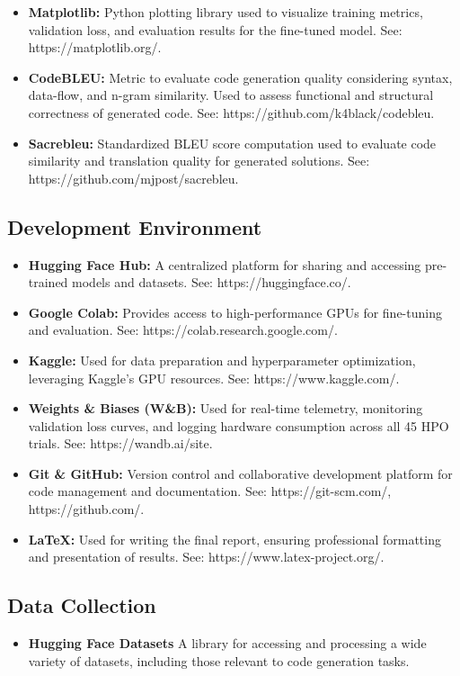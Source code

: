 \begin{itemize}
    \item \textbf{Matplotlib:} Python plotting library used to visualize training metrics, validation loss, and evaluation results for the fine-tuned model. See: https://matplotlib.org/.
    \item \textbf{CodeBLEU:} Metric to evaluate code generation quality considering syntax, data-flow, and n-gram similarity. Used to assess functional and structural correctness of generated code. See: https://github.com/k4black/codebleu.
    \item \textbf{Sacrebleu:} Standardized BLEU score computation used to evaluate code similarity and translation quality for generated solutions. See: https://github.com/mjpost/sacrebleu.
\end{itemize}

\subsection{Development Environment}
\begin{itemize}
    \item \textbf{Hugging Face Hub:}
    A centralized platform for sharing and accessing pre-trained models and datasets. See: https://huggingface.co/.
    \item \textbf{Google Colab:}
    Provides access to high-performance GPUs for fine-tuning and evaluation. See: https://colab.research.google.com/.
    \item \textbf{Kaggle:}
    Used for data preparation and hyperparameter optimization, leveraging Kaggle's GPU resources. See: https://www.kaggle.com/.
    \item \textbf{Weights \& Biases (W\&B):} 
    Used for real-time telemetry, monitoring validation loss curves, and logging hardware consumption across all 45 HPO trials. See: https://wandb.ai/site.
    \item \textbf{Git \& GitHub:}
    Version control and collaborative development platform for code management and documentation. See: https://git-scm.com/, https://github.com/.
    \item \textbf{LaTeX:}
    Used for writing the final report, ensuring professional formatting and presentation of results. See: https://www.latex-project.org/.
\end{itemize}

\subsection{Data Collection}
\begin{itemize}
    \item \textbf{Hugging Face Datasets}
    A library for accessing and processing a wide variety of datasets, including those relevant to code generation tasks.
\end{itemize}


